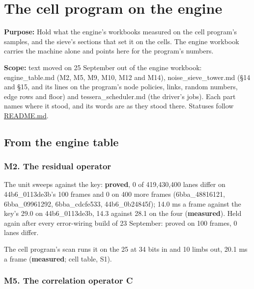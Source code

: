 \chapter{\texorpdfstring{The cell program on the engine}{The cell program on the engine}}
\label{chap:on-the-engine}

\textbf{Purpose:} Hold what the engine's workbooks measured on the cell program's samples, and the sieve's sections that set it on the cells. The engine workbook carries the machine alone and points here for the program's numbers.

\textbf{Scope:} text moved on 25 September out of the engine workbook: engine\_\allowbreak{}table.md (M2, M5, M9, M10, M12 and M14), noise\_\allowbreak{}sieve\_\allowbreak{}tower.md (§14 and §15, and its lines on the program's node policies, links, random numbers, edge rows and floor) and tessera\_\allowbreak{}scheduler.md (the driver's jobs). Each part names where it stood, and its words are as they stood there. Statuses follow \hyperref[chap:readme]{README.md}.

\section{\texorpdfstring{From the engine table}{From the engine table}}

\subsection{\texorpdfstring{M2. The residual operator}{M2. The residual operator}}

The unit sweeps against the key: \textbf{proved}, 0 of 419,430,400 lanes differ on 44b6\_\allowbreak{}0113de3b's 100 frames and 0 on 400 more frames (6bba\_\allowbreak{}48816121, 6bba\_\allowbreak{}09961292, 6bba\_\allowbreak{}cdcfe533, 44b6\_\allowbreak{}0b24845f); 14.0 ms a frame against the key's 29.0 on 44b6\_\allowbreak{}0113de3b, 14.3 against 28.1 on the four (\textbf{measured}). Held again after every error-wiring build of 23 September: proved on 100 frames, 0 lanes differ.

The cell program's scan runs it on the 25 at 34 bits in and 10 limbs out, 20.1 ms a frame (\textbf{measured}; cell table, S1).

\subsection{\texorpdfstring{M5. The correlation operator C}{M5. The correlation operator C}}

